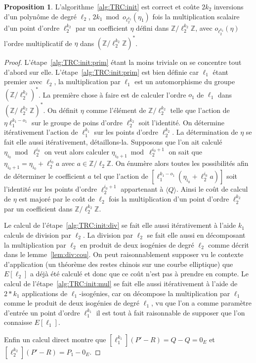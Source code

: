 \documentclass[10pt,a4paper]{book}
\theoremstyle{plain}
\theoremstyle{definition}
\theoremstyle{definition}
\theoremstyle{definition}
\newtheorem{prop}[thm]{Proposition}
\theoremstyle{definition}
\theoremstyle{remark}
\theoremstyle{remark}
\theoremstyle{definition}
\begin{document}
\begin{prop}
L'algorithme~\ref{alg:TRC:init} est correct et coûte $2k_2$ inversions d'un polynôme de degré $\ell_2$, $2k_1 \bmod o_{\ell_2^{k_2}}(\eta_1)$ fois la multiplication scalaire d'un point d'ordre $\ell_2^{k_2}$ par un coefficient $\eta$ défini dans $\mathbb{Z}/\ell_2^{k_2} \mathbb{Z}$, avec $o_{\ell_2^{k_2}}(\eta)$ l'ordre multiplicatif de $\eta$ dans $(\mathbb{Z}/\ell_2^{k_2} \mathbb{Z})^*$.
\end{prop}

\begin{proof}
L'étape~\ref{alg:TRC:init:prim} étant la moins triviale on se concentre tout 
d'abord sur elle. L'étape~\ref{alg:TRC:init:prim} est bien définie car 
$\ell_1$ étant premier avec $\ell_2$, la multiplication par $\ell_1$ est un 
automorphisme du groupe $(\mathbb{Z}/ \ell_2^{k_2})^*$. La première chose à faire 
est de calculer l'ordre $o_1$ de $\ell_1$ dans 
$(\mathbb{Z}/\ell_2^{k_2} \mathbb{Z})^*$. On définit $\eta$ comme l'élément de 
$\mathbb{Z}/ \ell_2^{k_2}$ telle que l'action de $\eta \ell_1^{k_1-o_1}$ sur le
 groupe de poins d'ordre $\ell_2^{k_2}$ soit l'identité. On détermine 
 itérativement l'action de $\ell_1^{k_1}$ sur les points d'ordre 
 $\ell_2^{k_2}$.  La détermination de $\eta$ se fait elle aussi itérativement, 
 détaillons-la. Supposons que l'on ait calculé $\eta_{i_0} \bmod \ell_2^{i_0}$ 
 on veut alors calculer $\eta_{i_0+1} \bmod \ell_2^{i_0+1}$ on sait que 
 $\eta_{i_0+1} = \eta_{i_0} + \ell_2^{i_0} a $ avec 
 $a \in \mathbb{Z}/ \ell_2 \mathbb{Z}$. On énumère alors toutes les 
 possibilités afin de déterminer le coefficient $a$ tel que l'action de  
 $[\ell_1^{k_1-o_1}(\eta_{i_0} + \ell_2^{i_0} a)]$ soit l'identité sur les 
 points d'ordre $\ell_2^{i_0+1}$ appartenant à $\langle Q \rangle$. Ainsi le 
 coût de calcul de $\eta$ est majoré par le coût de $\ell_2$ fois la 
 multiplication d'un point d'ordre $\ell_2^{k_2}$ par un coefficient dans 
 $\mathbb{Z}/ \ell_2^{k_2} \mathbb{Z}$.
 
 Le calcul de l'étape~\ref{alg:TRC:init:div} se fait elle aussi itérativement à 
 l'aide $k_1$ calculs de division par $\ell_2$. La division par $\ell_2$ se 
 fait elle aussi en décomposant la multiplication par $\ell_2$ en produit de 
 deux isogénies de degré $\ell_2$ comme décrit dans le lemme~\ref{lem:div:cou}. 
 On peut raisonnablement supposer vu le contexte d'application (un théorème des
 restes chinois sur une courbe elliptique) que $E[\ell_2]$ a déjà été calculé 
 et donc que ce coût n'est pas à prendre en compte. Le calcul de 
 l'étape~\ref{alg:TRC:init:mul} se fait elle aussi itérativement à l'aide de 
 $2*k_1$ applications de $\ell_1$-isogénies, car on décompose la multiplication
 par $\ell_1$ comme le produit de deux isogénies de degré $\ell_1$, vu que l'on
 a comme paramètre d'entrée un point d'ordre $\ell_1^{k_1}$ il est tout à fait 
 raisonnable de supposer que l'on connaisse $E[\ell_1]$.
 
 Enfin un calcul direct montre que $[\ell_1^{k_1}](P'-R)=Q-Q=0_E$ et 
 $[\ell_2^{k_2}](P'-R)=P_1-0_E$.
 
 
\end{proof}
\end{document}
